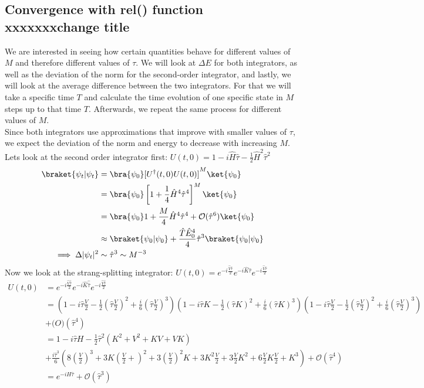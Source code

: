 \documentclass[11pt, letterpaper, onecolumn]{article}
\begin{document}
	\subsection{Convergence with rel() function xxxxxxxchange title}
	We are interested in seeing how certain quantities behave for different values of $M$ and therefore different values of $\tau$. We will look at $\Delta E$ for both integrators, as well as the deviation of the norm for the second-order integrator, and lastly, we will look at the average difference between the two integrators. For that we will take a specific time $T$ and calculate the time evolution of one specific state in $M$ steps up to that time $T$. Afterwards, we repeat the same process for different values of $M$.\\
    Since both integrators use approximations that improve with smaller values of $\tau$, we expect the deviation of the norm and energy to decrease with increasing $M$. Lets look at the second order integrator first: $U(t,0)=1-i\hat{H}\hat{\tau}-\frac12\hat{H}^2\hat{\tau}^2$
    \begin{align*}
        \braket{\psi_t|\psi_t}&=\bra{\psi_0}[U^\dagger(t,0)U(t,0)]^M\ket{\psi_0}\\
        &=\bra{\psi_0}\left[1+\frac{1}{4}\hat{H}^4\hat{\tau}^4 \right]^M\ket{\psi_0}\\
        &=\bra{\psi_0}1+\frac{M}{4}\hat{H}^4\hat{\tau}^4+\mathcal{O}(\hat{\tau}^6)\ket{\psi_0}\\
        &\approx \braket{\psi_0|\psi_0}+\frac{\hat{T}\hat{E}_0^4}{4}\hat{\tau}^3\braket{\psi_0|\psi_0}\\
        \implies \Delta|\psi_t|^2&\sim\hat{\tau}^3\sim M^{-3}
    \end{align*}
    Now we look at the strang-splitting integrator: $U(t,0)=e^{-i\frac{\hat{V}\hat{\tau}}{2}}e^{-i\hat{K}\hat{\tau}}e^{-i\frac{\hat{V}\hat{\tau}}{2}}$
    \begin{align*}
        U(t,0)&=e^{-i\frac{\hat{V}\hat{\hat{\tau}}}{2}}e^{-i\hat{K}\hat{\hat{\tau}}}e^{-i\frac{\hat{V}\hat{\hat{\tau}}}{2}}\\
        &=(1-i\hat{\tau}\frac{V}{2}-\frac{1}{2}\left(\hat{\tau}\frac{V}{2}\right)^2+\frac{i}{6}\left(\hat{\tau}\frac{V}{2}\right)^3)(1-i\hat{\tau} K-\frac{1}{2}\left(\hat{\tau} K\right)^2+\frac{i}{6}\left(\hat{\tau} K\right)^3)(1-i\hat{\tau}\frac{V}{2}-\frac{1}{2}\left(\hat{\tau}\frac{V}{2}\right)^2+\frac{i}{6}\left(\hat{\tau}\frac{V}{2}\right)^3)\\&+\mathcal(O)(\hat{\tau}^4)\\
        &=1-i\hat{\tau} H-\frac{1}{2}\hat{\tau}^2(K^2+V^2+KV+VK)\\&+\frac{i\hat{\tau}^3}{6}\left(8\left(\frac{V}{2} \right)^3 + 3K\left(\frac{V}{2} +\right)^2 + 3\left(\frac{V}{2} \right)^2K +3K^2\frac{V}{2}+3\frac{V}{2}K^2 +6\frac{V}{2}K\frac{V}{2}+K^3 \right) +\mathcal{O}(\hat{\tau}^4)\\
        &=e^{-iH\hat{\tau}}+\mathcal{O}(\hat{\tau}^3)
    \end{align*}
\end{document}
